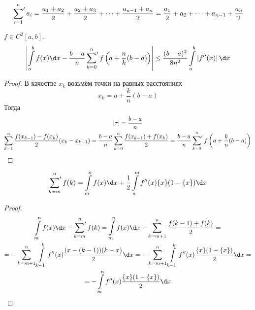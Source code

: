 \begin{Def}
	\[ \sideset{}{'}\sum_{i=1}^n a_i = \frac{a_1 + a_2}2 + \frac{a_2 + a_3}2 + \dots + \frac{a_{n - 1} + a_n}2 = \frac{a_1}2 + a_2 + \cdots + a_{n-1} + \frac{a_n}2 \]
\end{Def}
\begin{conseq}
	$f \in C^2[a, b]$.
	\[ \left| \int\limits_a^b f(x)\d x - \frac{b-a}n \sideset{}{'}\sum_{k=0}^n f\left(a+\frac{n}k(b-a)\right) \right| \le \frac{(b-a)^2}{8n^2} \int\limits_a^b \left|f''(x)\right|\d x \]	
\end{conseq}
\begin{proof}
	В качестве $x_k$ возьмём точки на равных расстояниях
	\[x_k = a + \frac{k}n(b - a)\]
	Тогда
	\begin{gather*}
		|\tau| = \frac{b-a}n \\
		\sum_{k=1}^n \frac{f(x_{k-1}) - f(x_k)}{2}(x_k - x_{k-1}) = \frac{b - a}n \sum_{k=0}^n \frac{f(x_{k - 1}) + f(x_k)}2 = \frac{b - a}n \sideset{}{'}\sum_{k=0}^n f\left(a + \frac{k}n(b - a)\right)
	\end{gather*}
\end{proof}

\begin{theorem}
	\[ \sideset{}{'}\sum_{k=m}^n f(k) = \int\limits_m^n f(x) \d x + \frac12 \int\limits_n^m f''(x) \{x\}(1-\{x\}) \d x \]
\end{theorem}
\begin{proof}
	\begin{gather*}
		\int\limits_m^n f(x) \d x - \sideset{}{'}\sum_{k=m}^n f(k) = \int\limits_m^n f(x) \d x - \sum_{k=m+1}^n \frac{f(k - 1) + f(k)}2 = \\
		= -\sum_{k=m+1}^n \int\limits_{k-1}^k f''(x) \frac{(x - (k-1))(k - x)}2 \d x = -\sum_{k=m+1}^n \int\limits_{k-1}^k f''(x) \frac{\{x\}(1-\{x\})}2 \d x = \\
		= -\int\limits_m^n f''(x) \frac{\{x\}(1-\{x\})}2 \d x
	\end{gather*}
\end{proof}

